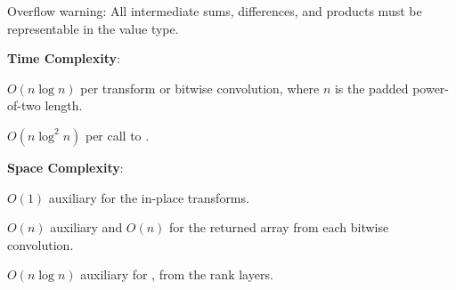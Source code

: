 Overflow warning: All intermediate sums, differences, and products must be representable in the value type.

\textbf{Time Complexity}:
\begin{compactitem}
  \item $O(n \log n)$ per transform or bitwise convolution, where $n$ is the padded power-of-two length.
  \item $O(n \log^{2} n)$ per call to .
\end{compactitem}

\textbf{Space Complexity}:
\begin{compactitem}
  \item $O(1)$ auxiliary for the in-place transforms.
  \item $O(n)$ auxiliary and $O(n)$ for the returned array from each bitwise convolution.
  \item $O(n \log n)$ auxiliary for , from the rank layers.
\end{compactitem}

